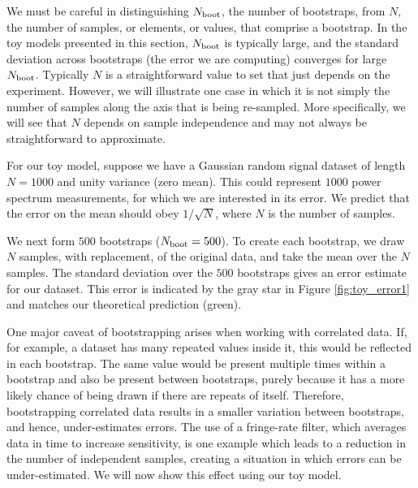 \documentclass[preprint2,numberedappendix,tighten]{aastex6}  %
\begin{document}
We must be careful in distinguishing $N_{\rm boot}$, the number of bootstraps, from $N$, the number of samples, or elements, or 
values, that comprise a bootstrap. In the toy models presented in this section, $N_{\rm boot}$ is typically large, and the standard 
deviation across bootstraps (the error we are computing) converges for large $N_{\rm boot}$. Typically $N$ is a straightforward value to set that just depends on the experiment. However, we will illustrate one case in which it is not simply the number of samples along the axis that is being re-sampled. More specifically, we will see that $N$ depends on sample independence and may not always be straightforward to approximate. 

For our toy model, suppose we have a Gaussian random signal dataset of length $N=1000$ and unity variance (zero mean). 
This could represent $1000$ power spectrum measurements, for which we are interested in its error. We predict that the error 
on the mean should obey $1/\sqrt{N}$, where $N$ is the number of samples.

We next form $500$ bootstraps ($N_{\rm boot} = 500$). To create each bootstrap, we draw $N$ samples, with replacement, of the 
original data, and take the mean over the $N$ samples. The standard deviation over the $500$ bootstraps gives an error 
estimate for our dataset. This error is indicated by the gray star in Figure \ref{fig:toy_error1} and matches our theoretical 
prediction (green).

One major caveat of bootstrapping arises when working with correlated data. If, for example, a dataset has many repeated 
values inside it, this would be reflected in each bootstrap. The same value would be present multiple times within a bootstrap 
and also be present between bootstraps, purely because it has a more likely chance of being drawn if there are repeats of 
itself. Therefore, bootstrapping correlated data results in a smaller variation between bootstraps, and hence, under-estimates 
errors. The use of a fringe-rate filter, which averages data in time to increase sensitivity, is one example which leads to a 
reduction in the number of independent samples, creating a situation in which errors can be under-estimated. We will now show 
this effect using our toy model.
\end{document}

